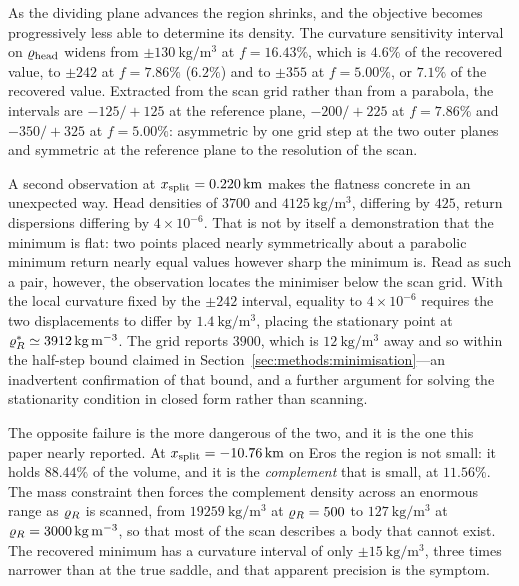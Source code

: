 As the dividing plane advances the region shrinks, and the objective
becomes progressively less able to determine its density. The curvature
sensitivity interval on $\varrho_{\mathrm{head}}$ widens from
$\pm\SI{130}{\kilo\gram\per\cubic\metre}$ at $f = 16.43\%$, which is
$4.6\%$ of the recovered value, to $\pm242$ at $f = 7.86\%$ ($6.2\%$) and
to $\pm355$ at $f = 5.00\%$, or $7.1\%$ of the recovered value. Extracted
from the scan grid rather than from a parabola, the intervals are
$-125/+125$ at the reference plane, $-200/+225$ at $f = 7.86\%$ and
$-350/+325$ at $f = 5.00\%$: asymmetric by one grid step at the two outer
planes and symmetric at the reference plane to the resolution of the scan.

A second observation at $x_{\mathrm{split}} = \SI{0.220}{\kilo\metre}$ makes the
flatness concrete in an unexpected way. Head densities of $3700$ and
$\SI{4125}{\kilo\gram\per\cubic\metre}$, differing by $425$, return
dispersions differing by $4\times10^{-6}$. That is not by itself a
demonstration that the minimum is flat: two points placed nearly
symmetrically about a parabolic minimum return nearly equal values however
sharp the minimum is. Read as such a pair, however, the observation
locates the minimiser below the scan grid. With the local curvature fixed
by the $\pm242$ interval, equality to $4\times10^{-6}$ requires the two
displacements to differ by $\SI{1.4}{\kilo\gram\per\cubic\metre}$, placing
the stationary point at $\varrho_{R}^{\ast} \simeq
\SI{3912}{\kilo\gram\per\cubic\metre}$. The grid reports $3900$, which is
$\SI{12}{\kilo\gram\per\cubic\metre}$ away and so within the half-step
bound claimed in Section~\ref{sec:methods:minimisation}---an inadvertent
confirmation of that bound, and a further argument for solving the
stationarity condition in closed form rather than scanning.

The opposite failure is the more dangerous of the two, and it is the one
this paper nearly reported. At $x_{\mathrm{split}} = \SI{-10.76}{\kilo\metre}$ on
Eros the region is not small: it holds $88.44\%$ of the volume, and it is
the \emph{complement} that is small, at $11.56\%$. The mass constraint
then forces the complement density across an enormous range as $\varrho_{R}$ is
scanned, from $\SI{19259}{\kilo\gram\per\cubic\metre}$ at
$\varrho_{R} = 500$ to $\SI{127}{\kilo\gram\per\cubic\metre}$ at
$\varrho_{R} = \SI{3000}{\kilo\gram\per\cubic\metre}$, so that most of the scan
describes a body that cannot exist. The recovered minimum has a curvature
interval of only $\pm\SI{15}{\kilo\gram\per\cubic\metre}$, three times
narrower than at the true saddle, and that apparent precision is the
symptom.

